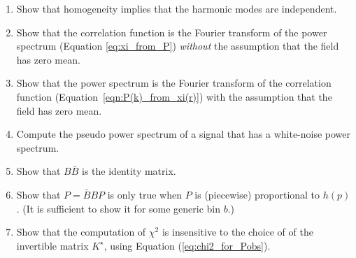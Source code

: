 \begin{enumerate}

\item Show that homogeneity implies that the harmonic modes are independent.

\item Show that the correlation function is the Fourier transform of the power spectrum (Equation \ref{eq:xi_from_P}) \textit{without} the assumption that the field has zero mean.

\item Show that the power spectrum is the Fourier transform of the correlation function (Equation~\ref{eqn:P(k)_from_xi(r)}) with the assumption that the field has zero mean. \label{ex:P_from_xi}

\item Compute the pseudo power spectrum of a signal that has a white-noise power spectrum.

\item Show that $B\bar B$ is the identity matrix.

\item Show that $P = \bar B B P$ is only true when $P$ is (piecewise) proportional to $h(p)$.  (It is sufficient to show it for some generic bin $b$.)

\item Show that the computation of $\chi^2$ is insensitive to the choice of of the invertible matrix $K^\star $, using Equation (\ref{eq:chi2_for_Pobs}).
  
\end{enumerate}

